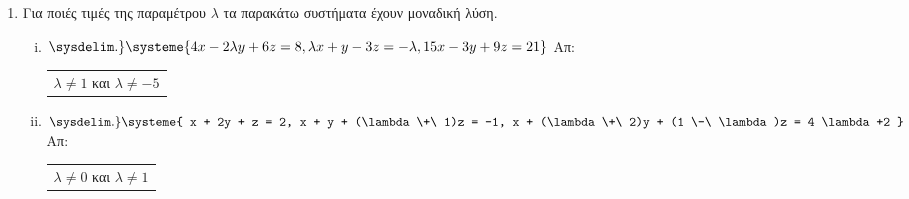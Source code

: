 


\usepackage{systeme}

\pagestyle{askhseis}

\setlength{\itemsep}{\baselineskip}





\begin{center}
  \minibox{\large \bfseries \textcolor{Col1}{Ασκήσεις στα παραμετρικά  συστήματα}}
\end{center}

\vspace{\baselineskip}

\begin{enumerate}
  \setlength{\itemsep}{\baselineskip}
\item Για ποιές τιμές της παραμέτρου $ \lambda $ τα παρακάτω συστήματα έχουν 
  μοναδική λύση.

  \begin{enumerate}[i)]
    \setlength{\itemsep}{\baselineskip}
  \item $\sysdelim.\} \systeme{4x-2\lambda y + 6z = 8, \lambda x + y -3z = -\lambda, 15x -3y + 9z = 21
  } $ \hfill Απ: \begin{tabular}{l}
    $\lambda \neq 1$ και $ \lambda \neq -5 $
  \end{tabular}


\item $ \sysdelim.\} \systeme{
  x + 2y + z = 2, 
  x + y + (\lambda  \+\ 1)z = -1, 
  x + (\lambda  \+\ 2)y + (1 \-\ \lambda)z = 4 \lambda +2
} $ \hfill Απ: \begin{tabular}{l}
    $\lambda \neq 0$ και $ \lambda \neq 1 $
\end{tabular} 
\end{enumerate}
\end{enumerate}



